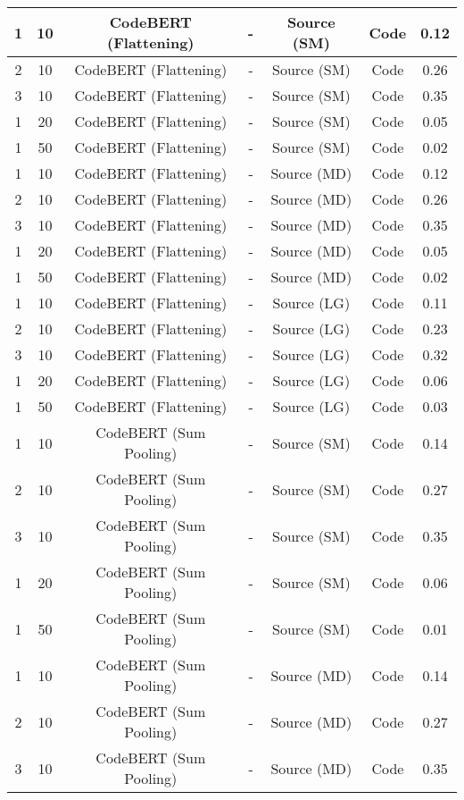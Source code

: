 \begin{longtable}{|c|c|c|c|c|c|c|}
\hline
1 & 10 & CodeBERT (Flattening) & - & Source (SM) & Code & 0.12 \\
\hline
2 & 10 & CodeBERT (Flattening) & - & Source (SM) & Code & 0.26 \\
\hline
3 & 10 & CodeBERT (Flattening) & - & Source (SM) & Code & 0.35 \\
\hline
1 & 20 & CodeBERT (Flattening) & - & Source (SM) & Code & 0.05 \\
\hline
1 & 50 & CodeBERT (Flattening) & - & Source (SM) & Code & 0.02 \\
\hline
1 & 10 & CodeBERT (Flattening) & - & Source (MD) & Code & 0.12 \\
\hline
2 & 10 & CodeBERT (Flattening) & - & Source (MD) & Code & 0.26 \\
\hline
3 & 10 & CodeBERT (Flattening) & - & Source (MD) & Code & 0.35 \\
\hline
1 & 20 & CodeBERT (Flattening) & - & Source (MD) & Code & 0.05 \\
\hline
1 & 50 & CodeBERT (Flattening) & - & Source (MD) & Code & 0.02 \\
\hline
1 & 10 & CodeBERT (Flattening) & - & Source (LG) & Code & 0.11 \\
\hline
2 & 10 & CodeBERT (Flattening) & - & Source (LG) & Code & 0.23 \\
\hline
3 & 10 & CodeBERT (Flattening) & - & Source (LG) & Code & 0.32 \\
\hline
1 & 20 & CodeBERT (Flattening) & - & Source (LG) & Code & 0.06 \\
\hline
1 & 50 & CodeBERT (Flattening) & - & Source (LG) & Code & 0.03 \\
\hline
1 & 10 & CodeBERT (Sum Pooling) & - & Source (SM) & Code & 0.14 \\
\hline
2 & 10 & CodeBERT (Sum Pooling) & - & Source (SM) & Code & 0.27 \\
\hline
3 & 10 & CodeBERT (Sum Pooling) & - & Source (SM) & Code & 0.35 \\
\hline
1 & 20 & CodeBERT (Sum Pooling) & - & Source (SM) & Code & 0.06 \\
\hline
1 & 50 & CodeBERT (Sum Pooling) & - & Source (SM) & Code & 0.01 \\
\hline
1 & 10 & CodeBERT (Sum Pooling) & - & Source (MD) & Code & 0.14 \\
\hline
2 & 10 & CodeBERT (Sum Pooling) & - & Source (MD) & Code & 0.27 \\
\hline
3 & 10 & CodeBERT (Sum Pooling) & - & Source (MD) & Code & 0.35 \\

\end{longtable}
